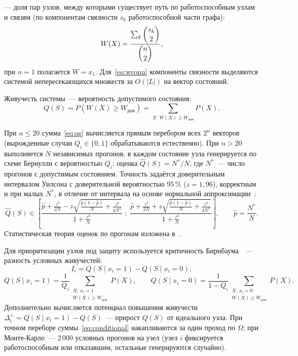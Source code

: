 \documentclass[12pt]{article}
\begin{document}
--- доля пар узлов, между которыми существует путь по работоспособным
узлам и связям (по компонентам связности $s_k$ работоспособной части
графа):
\begin{equation}
W(X) = \frac{\sum_k \dbinom{s_k}{2}}{\dbinom{n}{2}},
\label{eq:wconn}
\end{equation}
при $n = 1$ полагается $W = x_1$. Для~\eqref{eq:wconn} компоненты связности
выделяются системой непересекающихся множеств за $O(|L|)$ на вектор
состояний.

Живучесть системы~--- вероятность допустимого состояния:
\begin{equation}
Q(S) = P\!\left(W(X) \geq W_{\text{доп}}\right)
     = \sum_{X:\, W(X) \geq W_{\text{доп}}} P(X).
\label{eq:qs}
\end{equation}

При $n \leq 20$ сумма~\eqref{eq:qs} вычисляется прямым перебором всех
$2^n$ векторов (вырожденные случаи $Q_i \in \{0, 1\}$ обрабатываются
естественно). При $n > 20$ выполняется $N$ независимых прогонов, в каждом
состояние узла генерируется по схеме Бернулли с вероятностью $Q_i$;
оценка $\hat Q(S) = N^{*}/N$, где $N^{*}$~--- число прогонов с допустимым
состоянием. Точность задаётся доверительным интервалом Уилсона с
доверительной вероятностью 95\,\% ($z = 1{,}96$), корректным и при малых
$N^{*}$, в отличие от интервала на основе нормальной
аппроксимации~\cite{wilson,cramer}:
\begin{equation}
\hat Q(S) \in
\left[
\frac{\hat p + \frac{z^2}{2N} - z\sqrt{\frac{\hat p(1-\hat p)}{N}
+ \frac{z^2}{4N^2}}}{1 + \frac{z^2}{N}}
\;;\;
\frac{\hat p + \frac{z^2}{2N} + z\sqrt{\frac{\hat p(1-\hat p)}{N}
+ \frac{z^2}{4N^2}}}{1 + \frac{z^2}{N}}
\right], \qquad \hat p = \frac{N^{*}}{N}.
\label{eq:wilson}
\end{equation}
Статистическая теория оценок по прогонам изложена в~\cite{cramer,metropolis}.

Для приоритизации узлов под защиту используется критичность
Бирнбаума~\cite{birnbaum}~--- разность условных живучестей:
\begin{equation}
I_i = Q(S \mid x_i = 1) - Q(S \mid x_i = 0),
\label{eq:birnbaum}
\end{equation}
\begin{equation}
Q(S \mid x_i = 1) = \frac{1}{Q_i}\!\!
\sum_{\substack{X:\, x_i = 1 \\ W(X) \geq W_{\text{доп}}}}\!\! P(X),
\qquad
Q(S \mid x_i = 0) = \frac{1}{1 - Q_i}\!\!
\sum_{\substack{X:\, x_i = 0 \\ W(X) \geq W_{\text{доп}}}}\!\! P(X).
\label{eq:conditional}
\end{equation}
Дополнительно вычисляется потенциал повышения живучести
$\Delta_i^{+} = Q(S \mid x_i = 1) - Q(S)$~--- прирост $Q(S)$ от идеального
узла. При точном переборе суммы~\eqref{eq:conditional} накапливаются за один
проход по $\Omega$; при Монте-Карло~--- $2\,000$ условных прогонов на узел
(узел $i$ фиксируется работоспособным или отказавшим, остальные
генерируются случайно).
\end{document}
